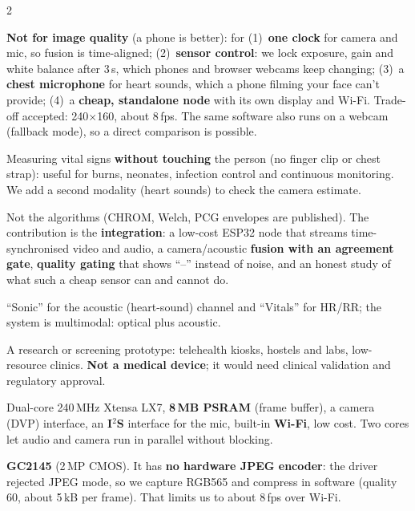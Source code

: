 \begin{multicols}{2}
\footnotesize
\setlength{\columnsep}{14pt}


{\textbf{Not for image quality} (a phone is better): for (1)~\textbf{one clock} for camera and mic, so fusion is time-aligned;
(2)~\textbf{sensor control}: we lock exposure, gain and white balance after 3\,s, which phones and browser webcams keep
changing; (3)~a \textbf{chest microphone} for heart sounds, which a phone filming your face can't provide; (4)~a
\textbf{cheap, standalone node} with its own display and Wi-Fi. Trade-off accepted: 240$\times$160, about 8\,fps. The same software
also runs on a webcam (fallback mode), so a direct comparison is possible.}

{Measuring vital signs \textbf{without touching} the person (no finger clip or chest strap): useful for burns, neonates, infection
control and continuous monitoring. We add a second modality (heart sounds) to check the camera estimate.}

{Not the algorithms (CHROM, Welch, PCG envelopes are published). The contribution is the \textbf{integration}: a
low-cost ESP32 node that streams time-synchronised video and audio, a camera/acoustic \textbf{fusion with an agreement gate},
\textbf{quality gating} that shows ``--'' instead of noise, and an honest study of what such a cheap sensor can and cannot do.}

{``Sonic'' for the acoustic (heart-sound) channel and ``Vitals'' for HR/RR; the system is multimodal: optical plus acoustic.}

{A research or screening prototype: telehealth kiosks, hostels and labs, low-resource clinics. \textbf{Not a medical device}; it
would need clinical validation and regulatory approval.}



{Dual-core 240\,MHz Xtensa LX7, \textbf{8\,MB PSRAM} (frame buffer), a camera (DVP) interface, an \textbf{I$^2$S} interface for the
mic, built-in \textbf{Wi-Fi}, low cost. Two cores let audio and camera run in parallel without blocking.}

{\textbf{GC2145} (2\,MP CMOS). It has \textbf{no hardware JPEG encoder}: the driver rejected JPEG mode, so we capture RGB565 and
compress in software (quality 60, about 5\,kB per frame). That limits us to about 8\,fps over Wi-Fi.}


\end{multicols}

